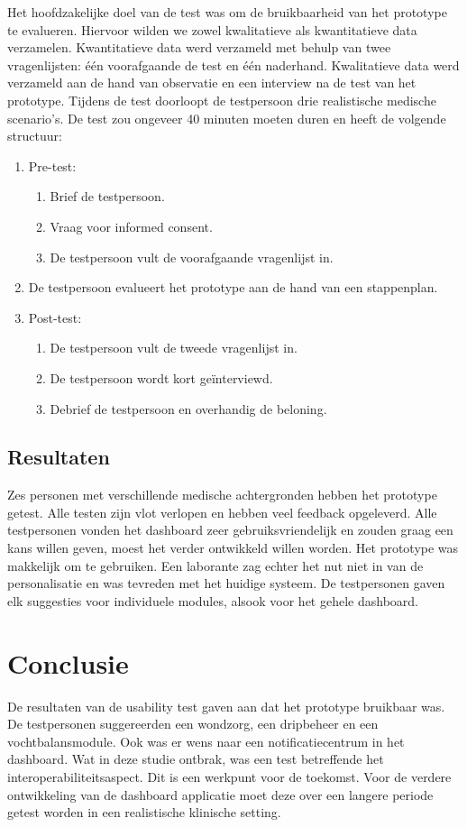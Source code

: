 \documentclass{article}
\begin{document}
    Het hoofdzakelijke doel van de test was om de bruikbaarheid van het prototype te evalueren. Hiervoor wilden we zowel kwalitatieve als kwantitatieve data verzamelen. Kwantitatieve data werd verzameld met behulp van twee vragenlijsten: \'{e}\'{e}n voorafgaande de test en \'{e}\'{e}n naderhand. Kwalitatieve data werd verzameld aan de hand van observatie en een interview na de test van het prototype. Tijdens de test doorloopt de testpersoon drie realistische medische scenario's. De test zou ongeveer 40 minuten moeten duren en heeft de volgende structuur:
    \begin{enumerate}
        \item Pre-test:
        \begin{enumerate}
            \item Brief de testpersoon.
            \item Vraag voor informed consent.
            \item De testpersoon vult de voorafgaande vragenlijst in.
        \end{enumerate}
        \item De testpersoon evalueert het prototype aan de hand van een stappenplan.
        \item Post-test:
        \begin{enumerate}
            \item De testpersoon vult de tweede vragenlijst in.
            \item De testpersoon wordt kort ge\"{i}nterviewd. 
            \item Debrief de testpersoon en overhandig de beloning.
        \end{enumerate}
    \end{enumerate}

    \subsection{Resultaten}

    Zes personen met verschillende medische achtergronden hebben het prototype getest. Alle testen zijn vlot verlopen en hebben veel feedback opgeleverd. Alle testpersonen vonden het dashboard zeer gebruiksvriendelijk en zouden graag een kans willen geven, moest het verder ontwikkeld willen worden. Het prototype was makkelijk om te gebruiken. Een laborante zag echter het nut niet in van de personalisatie en was tevreden met het huidige systeem. De testpersonen gaven elk suggesties voor individuele modules, alsook voor het gehele dashboard.

\section{Conclusie}

De resultaten van de usability test gaven aan dat het prototype bruikbaar was. De testpersonen suggereerden een wondzorg, een dripbeheer en een vochtbalansmodule. Ook was er wens naar een notificatiecentrum in het dashboard. Wat in deze studie ontbrak, was een test betreffende het interoperabiliteitsaspect. Dit is een werkpunt voor de toekomst. Voor de verdere ontwikkeling van de dashboard applicatie moet deze over een langere periode getest worden in een realistische klinische setting.
\end{document}
